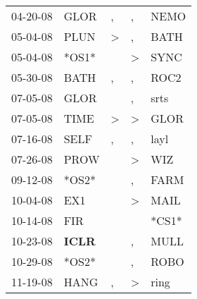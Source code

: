 \begin{supertabular}{p{0.07\textwidth}p{0.06\textwidth}p{0.02\textwidth}p{0.02\textwidth}p{0.06\textwidth}}
          04-20-08\textsuperscript{} &           GLOR\textsuperscript{} &                , &                , &           NEMO\textsuperscript{} \\
          05-04-08\textsuperscript{} &           PLUN\textsuperscript{} &     \textgreater &                , &           BATH\textsuperscript{} \\
          05-04-08\textsuperscript{} &                            *OS1* &                  &     \textgreater &           SYNC\textsuperscript{} \\
          05-30-08\textsuperscript{} &           BATH\textsuperscript{} &                , &                , &           ROC2\textsuperscript{} \\
          07-05-08\textsuperscript{} &           GLOR\textsuperscript{} &                  &                , &           srts\textsuperscript{} \\
          07-05-08\textsuperscript{} &           TIME\textsuperscript{} &     \textgreater &     \textgreater &           GLOR\textsuperscript{} \\
          07-16-08\textsuperscript{} &           SELF\textsuperscript{} &                , &                , &           layl\textsuperscript{} \\
          07-26-08\textsuperscript{} &           PROW\textsuperscript{} &                  &     \textgreater &            WIZ\textsuperscript{} \\
          09-12-08\textsuperscript{} &                            *OS2* &                  &                , &           FARM\textsuperscript{} \\
          10-04-08\textsuperscript{} &            EX1\textsuperscript{} &                  &     \textgreater &           MAIL\textsuperscript{} \\
          10-14-08\textsuperscript{} &            FIR\textsuperscript{} &                  &                  &                            *CS1* \\
          10-23-08\textsuperscript{} &  \textbf{ICLR\textsuperscript{}} &                  &                , &           MULL\textsuperscript{} \\
          10-29-08\textsuperscript{} &                            *OS2* &                  &                , &           ROBO\textsuperscript{} \\
          11-19-08\textsuperscript{} &           HANG\textsuperscript{} &                , &     \textgreater &           ring\textsuperscript{} \\

\end{supertabular}
